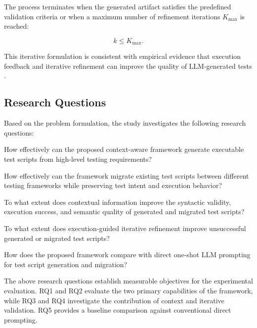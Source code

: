 \documentclass[pdflatex,sn-mathphys-num]{sn-jnl}
\begin{document}
The process terminates when the generated artifact satisfies the predefined
validation criteria or when a maximum number of refinement iterations
$K_{\max}$ is reached:

\begin{equation}
    k \leq K_{\max}.
\end{equation}

This iterative formulation is consistent with empirical evidence that
execution feedback and iterative refinement can improve the quality of
LLM-generated tests \cite{yuan2024chatgpt,schafer2024testpilot}.

\subsection{Research Questions}
\label{subsec:research-questions}

Based on the problem formulation, the study investigates the following
research questions:

\begin{description}[leftmargin=!,labelwidth=2.5cm]

    \item[RQ1:] How effectively can the proposed context-aware framework
    generate executable test scripts from high-level testing requirements?

    \item[RQ2:] How effectively can the framework migrate existing test
    scripts between different testing frameworks while preserving test
    intent and execution behavior?

    \item[RQ3:] To what extent does contextual information improve the
    syntactic validity, execution success, and semantic quality of generated
    and migrated test scripts?

    \item[RQ4:] To what extent does execution-guided iterative refinement
    improve unsuccessful generated or migrated test scripts?

    \item[RQ5:] How does the proposed framework compare with direct
    one-shot LLM prompting for test script generation and migration?

\end{description}

The above research questions establish measurable objectives for the
experimental evaluation. RQ1 and RQ2 evaluate the two primary capabilities
of the framework, while RQ3 and RQ4 investigate the contribution of context
and iterative validation. RQ5 provides a baseline comparison against
conventional direct prompting.
\end{document}
